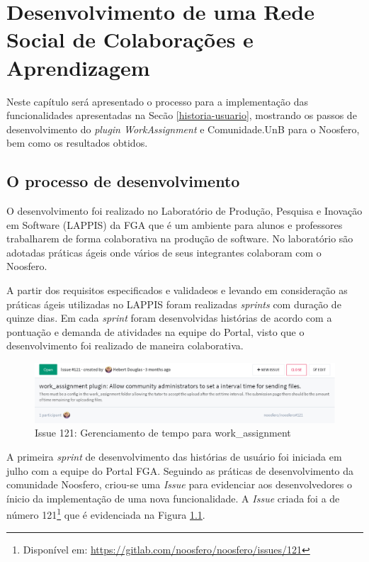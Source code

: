 \chapter{Desenvolvimento de uma Rede Social de Colaborações e Aprendizagem}
\label{desen-noosferAVA}

Neste capítulo será apresentado o processo para a implementação das funcionalidades apresentadas na Secão \ref{historia-usuario}, mostrando os passos de desenvolvimento do \textit{plugin WorkAssignment} e Comunidade.UnB para o Noosfero, bem como os resultados obtidos. 

\section{O processo de desenvolvimento}

O desenvolvimento foi realizado no Laboratório de Produção, Pesquisa e Inovação em Software (LAPPIS) da FGA que é um ambiente para  alunos e professores trabalharem de forma colaborativa na produção de software. No laboratório são adotadas práticas ágeis onde vários de seus integrantes colaboram com o Noosfero.

A partir dos requisitos especificados e validadeos e levando em consideração as práticas ágeis utilizadas no LAPPIS foram realizadas \textit{sprints} com duração de quinze dias. Em cada \textit{sprint} foram desenvolvidas histórias de acordo com a pontuação e demanda de atividades na equipe do Portal, visto que o desenvolvimento foi realizado de maneira colaborativa.

\begin{figure}[h]
    \centering
    \includegraphics[keepaspectratio=true,scale=0.4]
      {figuras/issue121.eps}
    \caption{Issue 121: Gerenciamento de tempo para work\_assignment}
    \label{fig:issue-121}
\end{figure}

A primeira \textit{sprint} de desenvolvimento das histórias de usuário foi iniciada em julho com a equipe do Portal FGA. Seguindo as práticas de desenvolvimento da comunidade Noosfero, criou-se uma \textit{Issue} para evidenciar aos desenvolvedores o ínicio da implementação de uma nova funcionalidade. A \textit{Issue} criada foi a de número 121\footnote{Disponível em: \url{https://gitlab.com/noosfero/noosfero/issues/121}} que  é evidenciada na Figura \ref{fig:issue-121}.

